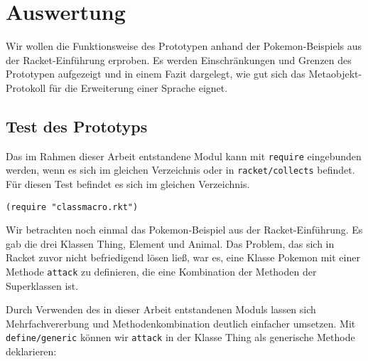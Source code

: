 
\pagestyle{diplHeadings}





\setcounter{page}{1}
\tableofcontents
\cleardoublepage 

\setcounter{page}{1} 
\mainmatter  
{}

 

 






\chapter{Auswertung}
Wir wollen die Funktionsweise des Prototypen anhand der Pokemon-Beispiels aus der Racket-Einführung erproben. Es werden Einschränkungen und Grenzen des Prototypen aufgezeigt und in einem Fazit dargelegt, wie gut sich das Metaobjekt-Protokoll für die Erweiterung einer Sprache eignet.

\section{Test des Prototyps}
Das im Rahmen dieser Arbeit entstandene Modul kann mit \texttt{require} eingebunden werden, wenn es sich im gleichen Verzeichnis oder in \texttt{racket/collects} befindet. Für diesen Test befindet es sich im gleichen Verzeichnis.

\begin{lstlisting}
(require "classmacro.rkt")
\end{lstlisting}

Wir betrachten noch einmal das Pokemon-Beispiel aus der Racket-Einführung. Es gab die drei Klassen Thing, Element und Animal. Das Problem, das sich in Racket zuvor nicht befriedigend lösen ließ, war es, eine Klasse Pokemon mit einer Methode \texttt{attack} zu definieren, die eine Kombination der Methoden der Superklassen ist. 

Durch Verwenden des in dieser Arbeit entstandenen Moduls lassen sich Mehrfachvererbung und Methodenkombination deutlich einfacher umsetzen. Mit \texttt{define/generic} können wir \texttt{attack} in der Klasse Thing als generische Methode deklarieren:

